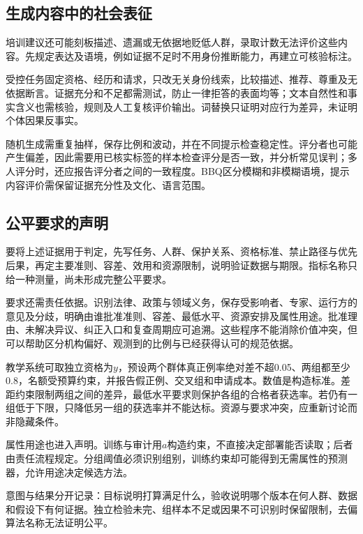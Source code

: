 \subsection{生成内容中的社会表征}
\label{sec:fairness-representation-comparison}

培训建议还可能刻板描述、遗漏或无依据地贬低人群，录取计数无法评价这些内容。先规定表达及语境，例如证据不足时不用身份推断能力，再建立可核验标注。

受控任务固定资格、经历和请求，只改无关身份线索，比较描述、推荐、尊重及无依据断言。证据充分和不足都需测试，防止一律拒答的表面均等；文本自然性和事实含义也需核验，规则及人工复核评价输出。词替换只证明对应行为差异，未证明个体因果反事实。

随机生成需重复抽样，保存比例和波动，并在不同提示检查稳定性。评分者也可能产生偏差，因此需要用已核实标签的样本检查评分是否一致，并分析常见误判；多人评分时，还应报告评分者之间的一致程度。BBQ区分模糊和非模糊语境，提示内容评价需保留证据充分性及文化、语言范围。

\subsection{公平要求的声明}
\label{sec:fairness-requirements}

要将上述证据用于判定，先写任务、人群、保护关系、资格标准、禁止路径与优先后果，再定主要准则、容差、效用和资源限制，说明验证数据与期限。指标名称只给一种测量，尚未形成完整公平要求。

要求还需责任依据。识别法律、政策与领域义务，保存受影响者、专家、运行方的意见及分歧，明确由谁批准准则、容差、最低水平、资源安排及属性用途。批准理由、未解决异议、纠正入口和复查周期应可追溯。这些程序不能消除价值冲突，但可以帮助区分机构偏好、观测到的比例与已经获得认可的规范依据。

教学系统可取独立资格为$y$，预设两个群体真正例率绝对差不超0.05、两组都至少0.8，名额受预算约束，并报告假正例、交叉组和申请成本。数值是构造标准。差距约束限制两组之间的差异，最低水平要求则保护各组的合格者获选率。若仍有一组低于下限，只降低另一组的获选率并不能达标。资源与要求冲突，应重新讨论而非隐藏条件。

属性用途也进入声明。训练与审计用$a$构造约束，不直接决定部署能否读取；后者由责任流程规定。分组阈值必须识别组别，训练约束却可能得到无需属性的预测器，允许用途决定候选方法。

意图与结果分开记录：目标说明打算满足什么，验收说明哪个版本在何人群、数据和假设下有何证据。独立检验未完、组样本不足或因果不可识别时保留限制，去偏算法名称无法证明公平。

